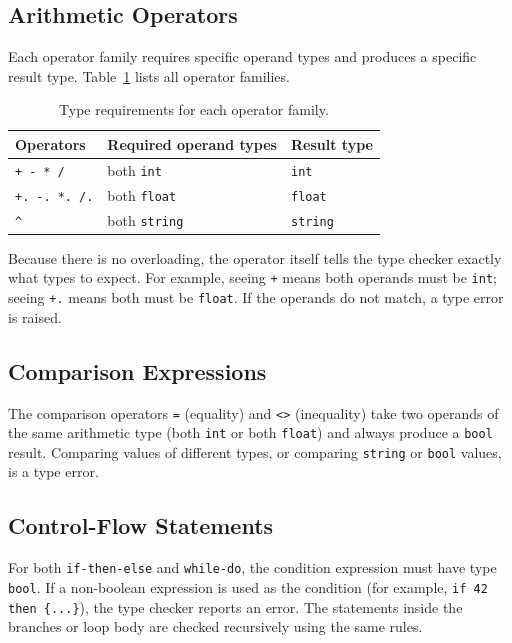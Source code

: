 \documentclass[12pt,a4paper]{report}
\newcommand{\tint}{\texttt{int}}
\newcommand{\tfloat}{\texttt{float}}
\newcommand{\tbool}{\texttt{bool}}
\newcommand{\tstring}{\texttt{string}}
\begin{document}
\subsection{Arithmetic Operators}
 
Each operator family requires specific operand types and produces a specific
result type. Table~\ref{tab:op-types} lists all operator families.
 
\begin{table}[H]
\centering
\caption{Type requirements for each operator family.}
\label{tab:op-types}
\begin{tabular}{@{} l l l @{}}
\toprule
\textbf{Operators} & \textbf{Required operand types} & \textbf{Result type} \\
\midrule
\texttt{+}~\texttt{-}~\texttt{*}~\texttt{/}       & both \tint   & \tint    \\
\texttt{+.}~\texttt{-.}~\texttt{*.}~\texttt{/.}    & both \tfloat & \tfloat  \\
\texttt{\^{}}                                       & both \tstring & \tstring \\
\bottomrule
\end{tabular}
\end{table}
 
Because there is no overloading, the operator itself tells the type checker
exactly what types to expect. For example, seeing \texttt{+} means both
operands must be \tint; seeing \texttt{+.} means both must be \tfloat.
If the operands do not match, a type error is raised.
 
\subsection{Comparison Expressions}
 
The comparison operators \texttt{=} (equality) and \texttt{<>} (inequality)
take two operands of the same arithmetic type (both \tint{} or both \tfloat)
and always produce a \tbool{} result. Comparing values of different types,
or comparing \tstring{} or \tbool{} values, is a type error.
 
\subsection{Control-Flow Statements}
 
For both \texttt{if-then-else} and \texttt{while-do}, the condition expression
must have type \tbool. If a non-boolean expression is used as the condition
(for example, \texttt{if 42 then \{...\}}), the type checker reports an
error. The statements inside the branches or loop body are checked recursively
using the same rules.
 
\end{document}
